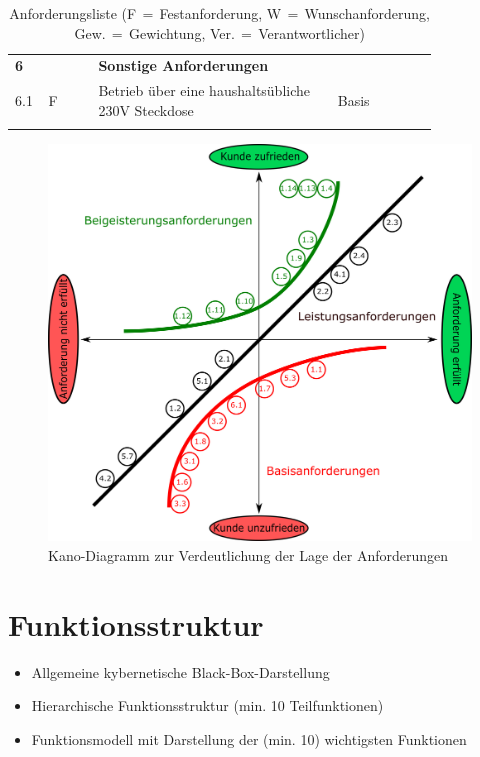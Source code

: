 \begin{longtable}{C{0.03\linewidth}C{0.05\linewidth}C{0.05\linewidth}L{0.5\linewidth}C{0.14\linewidth}C{0.07\linewidth}}
	\midrule
	
	\textbf{6} & & & \textbf{Sonstige Anforderungen} &&\\
	6.1 & F & & Betrieb über eine haushaltsübliche 230V Steckdose & Basis &\\
	
	\bottomrule
	
	\caption{Anforderungsliste (F$\,=\,$Festanforderung, W$\,=\,$Wunschanforderung, Gew.$\,=\,$Gewichtung, Ver.$\,=\,$Verantwortlicher)}
	\label{anforderungsliste}
\end{longtable}
\FloatBarrier
\begin{figure}[h!]
	\centering
	\includegraphics[width=\textwidth]{chapter/Bilder/kano} 
	\caption{Kano-Diagramm zur Verdeutlichung der Lage der Anforderungen}
\end{figure}


\section{Funktionsstruktur}

\begin{itemize}
	\item Allgemeine kybernetische Black-Box-Darstellung
	\item Hierarchische Funktionsstruktur (min. 10 Teilfunktionen)
	\item Funktionsmodell mit Darstellung der (min. 10) wichtigsten Funktionen
\end{itemize}


